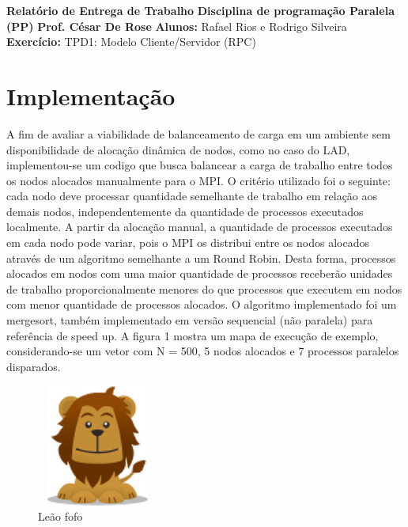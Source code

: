 \documentclass{article}
\begin{document}
\begin{multicols*}{2}
\textbf{Relatório de Entrega de Trabalho} \newline
\textbf{Disciplina de programação Paralela (PP)}\newline 
\textbf{Prof. César De Rose} \newline
\textbf{Alunos:} Rafael Rios e Rodrigo Silveira \newline
\textbf{Exercício:} TPD1: Modelo Cliente/Servidor (RPC) \newline

\section{Implementação}

A fim de avaliar a viabilidade de balanceamento de carga em um
ambiente sem disponibilidade de alocação dinâmica de nodos, como
no caso do LAD, implementou-se um codigo que busca balancear a
carga de trabalho entre todos os nodos alocados manualmente para
o MPI. O critério utilizado foi o seguinte: cada nodo deve processar
quantidade semelhante de trabalho em relação aos demais nodos,
independentemente da quantidade de processos executados
localmente. A partir da alocação manual, a quantidade de processos
executados em cada nodo pode variar, pois o MPI os distribui entre
os nodos alocados através de um algoritmo semelhante a um Round
Robin. Desta forma, processos alocados em nodos com uma maior
quantidade de processos receberão unidades de trabalho
proporcionalmente menores do que processos que executem em
nodos com menor quantidade de processos alocados. O algoritmo
implementado foi um mergesort, também implementado em versão
sequencial (não paralela) para referência de speed up. A figura 1
mostra um mapa de execução de exemplo, considerando-se um
vetor com N = 500, 5 nodos alocados e 7 processos paralelos
disparados.

\begin{figure}[H]
    \centering
    \includegraphics[width=4cm, height=4cm]{lion.png}
    \caption{Leão fofo}
\end{figure}


\end{multicols*}
\end{document}
